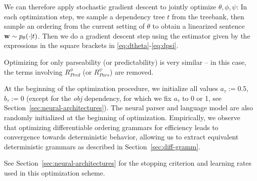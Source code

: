 \documentclass[10pt,twoside,lineno]{article}
\DeclareMathOperator{\E}{\mathop{\mathbb{E}}}
\begin{document}
We can therefore apply stochastic gradient descent to jointly optimize $\theta, \phi, \psi$:
In each optimization step, we sample a dependency tree $t$ from the treebank, then sample an ordering from the current setting of $\theta$ to obtain a linearized sentence ${\bf w} \sim p_{\theta}(\cdot|t)$.
Then we %
do a gradient descent step using the estimator given by the expressions in the square brackets in \ref{eq:dtheta}-\ref{eq:dpsi}.


Optimizing for only parseability (or predictability) is very similar -- in this case, the terms involving $R_{Pred}^\phi$ (or $R_{Pars}^\psi$) are removed.


At the beginning of the optimization procedure, we initialize all values $a_\tau := 0.5$, $b_\tau := 0$ (except for the \emph{obj} dependency, for which we fix $a_\tau$ to 0 or 1, see Section~\ref{sec:neural-architectures}).
The neural parser and language model are also randomly initialized at the beginning of optimization.
Empirically, we observe that optimizing differentiable ordering grammars for efficiency leads to convergence towards deterministic behavior, allowing us to extract equivalent deterministic grammars as described in Section~\ref{sec:diff-gramm}.


See Section~\ref{sec:neural-architectures} for the stopping criterion and learning rates used in this optimization scheme.



%
%
\end{document}

